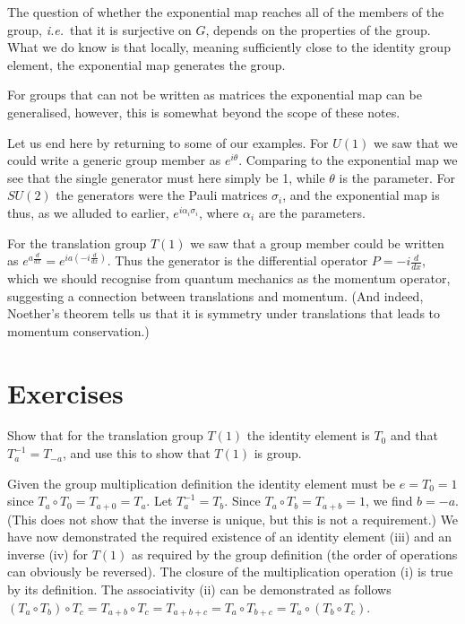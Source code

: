 \documentclass[notes.tex]{subfiles}
\begin{document}
The question of whether the exponential map reaches all of the members of the group, {\it i.e.}\ that it is surjective on $G$, depends on the properties of the group. What we do know is that locally, meaning sufficiently close to the identity group element, the exponential map generates the group.

For groups that can not be written as matrices the exponential map can be generalised, however, this is somewhat beyond the scope of these notes.

Let us end here by returning to some of our examples. For $U(1)$ we saw that we could write a generic group member as $e^{i\theta}$. Comparing to the exponential map we see that the single generator must here simply be 1, while $\theta$ is the parameter. For $SU(2)$ the generators were the Pauli matrices $\sigma_i$, and the exponential map is thus, as we alluded to earlier, $e^{i\alpha_i\sigma_i}$, where $\alpha_i$ are the parameters. 

For the translation group $T(1)$ we saw that a group member could be written as $e^{a\frac{d}{dx}}=e^{ia(-i\frac{d}{dx})}$. Thus the generator is the differential operator $P=-i\frac{d}{dx}$, which we should recognise from quantum mechanics as the momentum operator, suggesting a connection between translations and momentum. (And indeed, Noether's theorem tells us that it is symmetry under translations that leads to momentum conservation.)



\section{Exercises}
\begin{Exercise}[]
Show that for the translation group $T(1)$ the identity element is $T_0$ and that $T_a^{-1} = T_{-a}$, and use this to show that $T(1)$ is group.
\end{Exercise}

\begin{Answer}
Given the group multiplication definition the identity element must be $e=T_0=1$ since $T_a\circ T_0=T_{a+0}=T_a$. Let $T_a^{-1} =T_b$. Since $T_a \circ T_b=T_{a+b}=1$, we find $b=-a$. (This does not show that the inverse is unique, but this is not a requirement.) We have now demonstrated the required existence of an identity element (iii) and an inverse (iv) for $T(1)$ as required by the group definition (the order of operations can obviously be reversed). The closure of the multiplication operation (i) is true by its definition. The associativity (ii) can be demonstrated as follows $(T_a\circ T_b)\circ T_c=T_{a+b}\circ T_c=T_{a+b+c}=T_{a}\circ T_{b+c}=T_a\circ (T_b\circ T_c)$.
\end{Answer}
\end{document}
